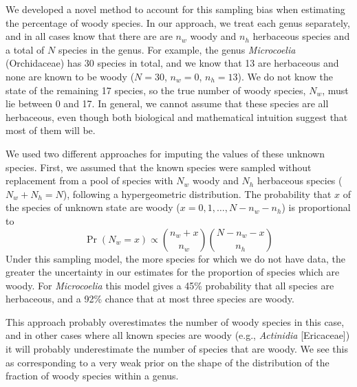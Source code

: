 \documentclass[a4paper,12pt]{article}
\begin{document}

We developed a novel method to account for this sampling bias when
estimating the percentage of woody species.  In our approach, we treat
each genus separately, and in all cases know that there are are $n_w$
woody and $n_h$ herbaceous species and a total of $N$ species in the genus.
%
For example, the genus \textit{Microcoelia} (Orchidaceae) has 30
species in total, and we know that 13 are herbaceous and none are
known to be woody ($N = 30$, $n_w = 0$, $n_h = 13$). We do not know
the state of the remaining 17 species, so the true number of woody
species, $N_w$, must lie between 0 and 17. In general, we cannot
assume that these species are all herbaceous, even though both
biological and mathematical intuition suggest that most of them will
be.

We used two different approaches for imputing the values of these
unknown species. First, we assumed that the known species were sampled
without replacement from a pool of species with $N_w$ woody and $N_h$
herbaceous species ($N_w + N_h = N$), following a hypergeometric
distribution. The probability that $x$ of the species of unknown state
are woody ($x = 0, 1, \ldots, N - n_w - n_h$) is proportional to
\begin{equation}
  \Pr(N_w = x) \propto {n_w + x \choose n_w}
  {N - n_w - x \choose n_h}
\end{equation}
Under this sampling model, the more species for which we do not have data,
the greater the uncertainty in our estimates for the proportion of species
which are woody.
For \textit{Microcoelia} this model gives a 45\% probability that all
species are herbaceous, and a 92\% chance that at most three species
are woody.

This approach probably overestimates the number of woody species in
this case, and in other cases where all known species are woody (e.g.,
\textit{Actinidia} [Ericaceae]) it will probably underestimate the
number of species that are woody. We see this as corresponding to a
very weak prior on the shape of the distribution of the fraction of
woody species within a genus.
\end{document}
